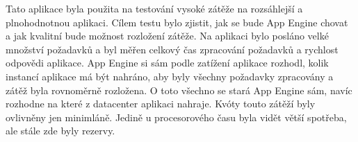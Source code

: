 Tato aplikace byla použita na testování vysoké zátěže na rozsáhlejší a plnohodnotnou aplikaci. Cílem testu bylo zjistit, jak se bude App Engine chovat a jak kvalitní bude možnost rozložení zátěže. Na aplikaci bylo posláno velké množství požadavků a byl měřen celkový čas zpracování požadavků a rychlost odpovědi aplikace.
App Engine si sám podle zatížení aplikace rozhodl, kolik instancí aplikace má být nahráno, aby byly všechny požadavky zpracovány a zátěž byla rovnoměrně rozložena. O toto všechno se stará App Engine sám, navíc rozhodne na které z datacenter aplikaci nahraje. Kvóty touto zátěží byly ovlivněny jen minimláně. Jedině u procesorového času byla vidět větší spotřeba, ale stále zde byly rezervy. 